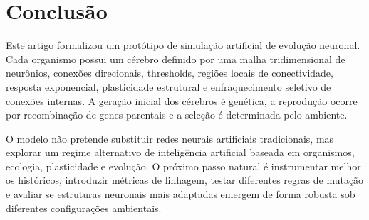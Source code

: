 \documentclass[12pt,a4paper,fleqn]{article}
\begin{document}
\section{Conclusão}

Este artigo formalizou um protótipo de simulação artificial de evolução neuronal. Cada organismo possui um cérebro definido por uma malha tridimensional de neurônios, conexões direcionais, thresholds, regiões locais de conectividade, resposta exponencial, plasticidade estrutural e enfraquecimento seletivo de conexões internas. A geração inicial dos cérebros é genética, a reprodução ocorre por recombinação de genes parentais e a seleção é determinada pelo ambiente.

O modelo não pretende substituir redes neurais artificiais tradicionais, mas explorar um regime alternativo de inteligência artificial baseada em organismos, ecologia, plasticidade e evolução. O próximo passo natural é instrumentar melhor os históricos, introduzir métricas de linhagem, testar diferentes regras de mutação e avaliar se estruturas neuronais mais adaptadas emergem de forma robusta sob diferentes configurações ambientais.
\end{document}
